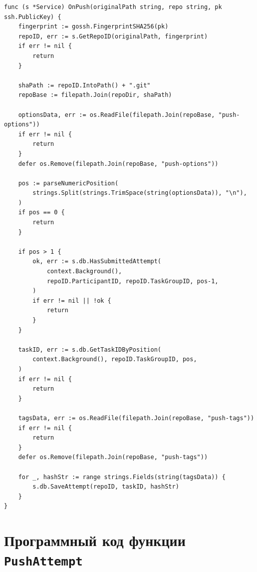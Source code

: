 \documentclass[coursework]{SCWorks}
\begin{document}
\begin{verbatim}
func (s *Service) OnPush(originalPath string, repo string, pk ssh.PublicKey) {
    fingerprint := gossh.FingerprintSHA256(pk)
    repoID, err := s.GetRepoID(originalPath, fingerprint)
    if err != nil {
        return
    }

    shaPath := repoID.IntoPath() + ".git"
    repoBase := filepath.Join(repoDir, shaPath)

    optionsData, err := os.ReadFile(filepath.Join(repoBase, "push-options"))
    if err != nil {
        return
    }
    defer os.Remove(filepath.Join(repoBase, "push-options"))

    pos := parseNumericPosition(
        strings.Split(strings.TrimSpace(string(optionsData)), "\n"),
    )
    if pos == 0 {
        return
    }

    if pos > 1 {
        ok, err := s.db.HasSubmittedAttempt(
            context.Background(),
            repoID.ParticipantID, repoID.TaskGroupID, pos-1,
        )
        if err != nil || !ok {
            return
        }
    }

    taskID, err := s.db.GetTaskIDByPosition(
        context.Background(), repoID.TaskGroupID, pos,
    )
    if err != nil {
        return
    }

    tagsData, err := os.ReadFile(filepath.Join(repoBase, "push-tags"))
    if err != nil {
        return
    }
    defer os.Remove(filepath.Join(repoBase, "push-tags"))

    for _, hashStr := range strings.Fields(string(tagsData)) {
        s.db.SaveAttempt(repoID, taskID, hashStr)
    }
}
\end{verbatim}

\section{Программный код функции \texttt{PushAttempt}}
\label{sec:webpush}
\end{document}
